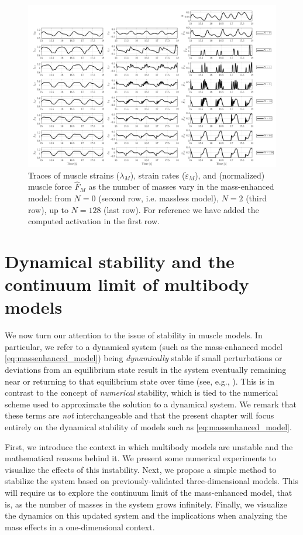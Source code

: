 \documentclass{sfuthesis}
\numberwithin{equation}{section}
\numberwithin{figure}{chapter}
\numberwithin{table}{chapter}
\theoremstyle{definition}
\newcommand{\depsilon}{\dot{\varepsilon}}
\begin{document}
\begin{figure}
    \centering
    \hspace*{-3.5em}\includegraphics[width=1.2\textwidth]{multibody-homog-study.png}
    \caption{Traces of muscle strains ($\lambda_M$), strain rates ($\depsilon_M$), and (normalized) muscle force $\widehat{F}_M$ as the number of masses vary in the mass-enhanced model: from $N=0$ (second row, i.e. massless model), $N=2$ (third row), up to $N=128$ (last row). For reference we have added the computed activation in the first row.}
    \label{fig:multibody-homog-study}
\end{figure}


\chapter{Dynamical stability and the continuum limit of multibody models}

We now turn our attention to the issue of stability in muscle models. In particular, we refer to a dynamical system (such as the mass-enhanced model \eqref{eq:massenhanced_model}) being \textit{dynamically} stable if small perturbations or deviations from an equilibrium state result in the system eventually remaining near or returning to that equilibrium state over time (see, e.g., \cite{strogratz}). This is in contrast to the concept of \textit{numerical} stability, which is tied to the numerical scheme used to approximate the solution to a dynamical system. We remark that these terms are \textit{not} interchangeable and that the present chapter will focus entirely on the dynamical stability of models such as \eqref{eq:massenhanced_model}.

First, we introduce the context in which multibody models are unstable and the mathematical reasons behind it. We present some numerical experiments to visualize the effects of this instability. Next, we propose a simple method to stabilize the system based on previously-validated three-dimensional models. This will require us to explore the continuum limit of the mass-enhanced model, that is, as the number of masses in the system grows infinitely. Finally, we visualize the dynamics on this updated system and the implications when analyzing the mass effects in a one-dimensional context.
\end{document}
